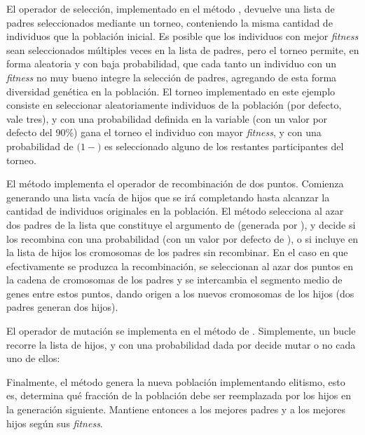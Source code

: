 El operador de selección, implementado en el método , devuelve una lista de padres seleccionados mediante un torneo, conteniendo la misma cantidad de individuos que la población inicial. Es posible que los individuos con mejor \textit{fitness} sean seleccionados múltiples veces en la lista de padres, pero el torneo permite, en forma aleatoria y con baja probabilidad, que cada tanto un individuo con un \textit{fitness} no muy bueno integre la selección de padres, agregando de esta forma diversidad genética en la población. El torneo implementado en este ejemplo consiste en seleccionar aleatoriamente  individuos de la población (por defecto,  vale tres), y con una probabilidad definida en la variable  (con un valor por defecto del 90\%) gana el torneo el individuo con mayor \textit{fitness}, y con una probabilidad de $(1 - $$)$ es seleccionado alguno de los restantes participantes del torneo.

El método  implementa el operador de recombinación de dos puntos. Comienza generando una lista vacía de hijos que se irá completando hasta alcanzar la cantidad de individuos originales en la población. El método selecciona al azar dos padres de la lista que constituye el argumento de  (generada por ), y decide si los recombina con una probabilidad  (con un valor por defecto de ), o si incluye en la lista de hijos los cromosomas de los padres sin recombinar. En el caso en que efectivamente se produzca la recombinación, se seleccionan al azar dos puntos en la cadena de cromosomas de los padres y se intercambia el segmento medio de genes entre estos puntos, dando origen a los nuevos cromosomas de los hijos (dos padres generan dos hijos).


El operador de mutación se implementa en el método  de . Simplemente, un bucle recorre la lista de hijos, y con una probabilidad dada por  decide mutar o no cada uno de ellos:


Finalmente, el método  genera la nueva población implementando elitismo, esto es, determina qué fracción de la población debe ser reemplazada por los hijos en la generación siguiente. Mantiene entonces a los mejores padres y a los mejores hijos según sus \textit{fitness}.

